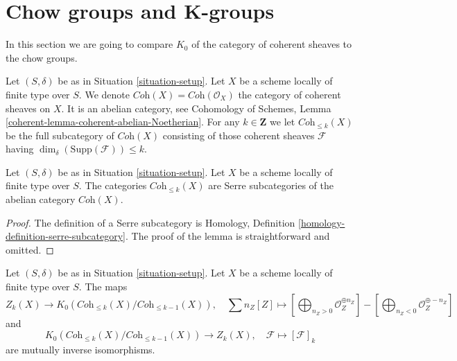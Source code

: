 \section{Chow groups and K-groups}
\label{section-chow-and-K}

\noindent
In this section we are going to compare $K_0$ of the
category of coherent sheaves to the chow groups.

\medskip\noindent
Let $(S, \delta)$ be as in Situation \ref{situation-setup}.
Let $X$ be a scheme locally of finite type over $S$.
We denote $\textit{Coh}(X) = \textit{Coh}(\mathcal{O}_X)$
the category of coherent sheaves on $X$.
It is an abelian category, see
Cohomology of Schemes, Lemma \ref{coherent-lemma-coherent-abelian-Noetherian}.
For any $k \in \mathbf{Z}$ we let $\textit{Coh}_{\leq k}(X)$
be the full subcategory of $\textit{Coh}(X)$
consisting of those coherent sheaves $\mathcal{F}$
having $\dim_\delta(\text{Supp}(\mathcal{F})) \leq k$.

\begin{lemma}
\label{lemma-Serre-subcategories}
Let $(S, \delta)$ be as in Situation \ref{situation-setup}.
Let $X$ be a scheme locally of finite type over $S$.
The categories $\textit{Coh}_{\leq k}(X)$ are Serre subcategories
of the abelian category $\textit{Coh}(X)$.
\end{lemma}

\begin{proof}
The definition of a Serre subcategory is
Homology, Definition \ref{homology-definition-serre-subcategory}.
The proof of the lemma is straightforward and omitted.
\end{proof}

\begin{lemma}
\label{lemma-cycles-k-group}
Let $(S, \delta)$ be as in Situation \ref{situation-setup}.
Let $X$ be a scheme locally of finite type over $S$.
The maps
$$
Z_k(X)
\longrightarrow
K_0(\textit{Coh}_{\leq k}(X)/\textit{Coh}_{\leq k - 1}(X)),
\quad
\sum n_Z[Z] \mapsto
\left[\bigoplus\nolimits_{n_Z > 0} \mathcal{O}_Z^{\oplus n_Z}\right]
-
\left[\bigoplus\nolimits_{n_Z < 0} \mathcal{O}_Z^{\oplus -n_Z}\right]
$$
and
$$
K_0(\textit{Coh}_{\leq k}(X)/\textit{Coh}_{\leq k - 1}(X))
\longrightarrow
Z_k(X),\quad
\mathcal{F} \longmapsto [\mathcal{F}]_k
$$
are mutually inverse isomorphisms.
\end{lemma}

